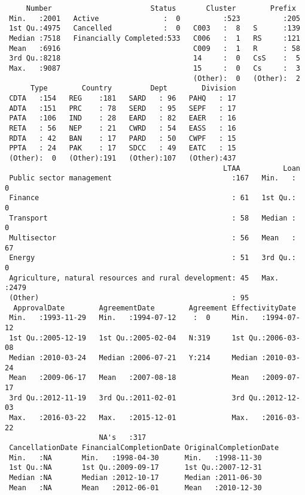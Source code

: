 \documentclass[11pt]{article}
\begin{document}
    
    \begin{verbatim}
     Number                       Status       Cluster        Prefix   
 Min.   :2001   Active               :  0          :523          :205  
 1st Qu.:4975   Cancelled            :  0   C003   :  8   S      :139  
 Median :7518   Financially Completed:533   C006   :  1   RS     :121  
 Mean   :6916                               C009   :  1   R      : 58  
 3rd Qu.:8218                               14     :  0   CsS    :  5  
 Max.   :9087                               15     :  0   Cs     :  3  
                                            (Other):  0   (Other):  2  
      Type        Country         Dept        Division  
 CDTA   :154   REG    :181   SARD   : 96   PAHQ   : 17  
 ADTA   :151   PRC    : 78   SERD   : 95   SEPF   : 17  
 PATA   :106   IND    : 28   EARD   : 82   EAER   : 16  
 RETA   : 56   NEP    : 21   CWRD   : 54   EASS   : 16  
 RDTA   : 42   BAN    : 17   PARD   : 50   CWPF   : 15  
 PPTA   : 24   PAK    : 17   SDCC   : 49   EATC   : 15  
 (Other):  0   (Other):191   (Other):107   (Other):437  
                                                   LTAA          Loan     
 Public sector management                            :167   Min.   :   0  
 Finance                                             : 61   1st Qu.:   0  
 Transport                                           : 58   Median :   0  
 Multisector                                         : 56   Mean   :  67  
 Energy                                              : 51   3rd Qu.:   0  
 Agriculture, natural resources and rural development: 45   Max.   :2479  
 (Other)                                             : 95                 
  ApprovalDate        AgreementDate        Agreement EffectivityDate     
 Min.   :1993-11-29   Min.   :1994-07-12    :  0     Min.   :1994-07-12  
 1st Qu.:2005-12-19   1st Qu.:2005-02-04   N:319     1st Qu.:2006-03-08  
 Median :2010-03-24   Median :2006-07-21   Y:214     Median :2010-03-24  
 Mean   :2009-06-17   Mean   :2007-08-18             Mean   :2009-07-17  
 3rd Qu.:2012-11-19   3rd Qu.:2011-02-01             3rd Qu.:2012-12-03  
 Max.   :2016-03-22   Max.   :2015-12-01             Max.   :2016-03-22  
                      NA's   :317                                        
 CancellationDate FinancialCompletionDate OriginalCompletionDate
 Min.   :NA       Min.   :1998-04-30      Min.   :1998-11-30    
 1st Qu.:NA       1st Qu.:2009-09-17      1st Qu.:2007-12-31    
 Median :NA       Median :2012-10-17      Median :2011-06-30    
 Mean   :NA       Mean   :2012-06-01      Mean   :2010-12-30    

\end{verbatim}
\end{document}
